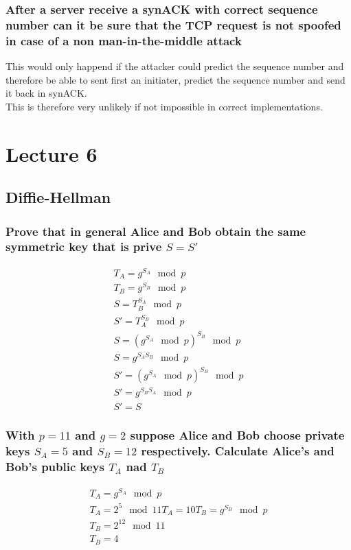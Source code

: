 \documentclass[12pt, a4paper]{article}
\begin{document}
			\subsubsection{After a server receive a synACK with correct sequence number can it be sure that the TCP request is not spoofed in case of a non man-in-the-middle attack}
				This would only happend if the attacker could predict the sequence number and therefore be able to sent first an initiater, predict the sequence number and send it back in synACK.\\
				This is therefore very unlikely if not impossible in correct implementations.
	\section{Lecture 6}
		\subsection{Diffie-Hellman}
			\subsubsection{Prove that in general Alice and Bob obtain the same symmetric key that is prive $S=S'$}
				\begin{align*}
					T_A=g^{S_A}\mod p\\
					T_B=g^{S_B}\mod p\\
					S=T_B^{S_A}\mod p\\
					S'=T_A^{S_B}\mod p\\
					S=(g^{S_A}\mod p)^{S_B}\mod p\\
					S=g^{S_AS_B}\mod p\\
					S'=(g^{S_A}\mod p)^{S_B}\mod p\\
					S'=g^{S_BS_A}\mod p\\
					S'=S
				\end{align*}
			\subsubsection{With $p=11$ and $g=2$ suppose Alice and Bob choose private keys $S_A=5$ and $S_B=12$ respectively. Calculate Alice's and Bob's public keys $T_A$ nad $T_B$}
				\begin{align*}
					T_A=g^{S_A}\mod p\\
					T_A=2^5\mod 11
					T_A=10
					T_B=g^{S_B}\mod p\\
					T_B=2^{12}\mod 11\\
					T_B=4
				\end{align*}
\end{document}
